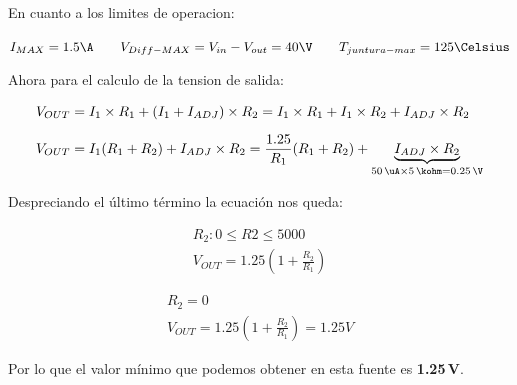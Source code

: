 \documentclass[chaptersright]{informeutn}
\begin{document}
        En cuanto a los limites de operacion:

        \begin{center}
          $I_{MAX}=1.5\A \qquad V_{Diff-MAX}=V_{in}-V_{out}=40\V \qquad T_{juntura-max}=125\Celsius$
        \end{center}

        Ahora para el calculo de la tension de salida:

        \begin{align*}
          V_{OUT} &= I_1 \times R_1 + \left(I_1 + I_{ADJ}\right) \times R_2
          = I_1 \times R_1 + I_1 \times R_2 + I_{ADJ} \times R_2 \\[6pt]
          V_{OUT} &= I_1 (R_1 + R_2) + I_{ADJ} \times R_2
          = \frac{1.25}{R_1} (R_1 + R_2) + \underbrace{I_{ADJ} \times R_2}_{50\,\uA \times 5\,\kohm = 0.25\,\V}
        \end{align*}

        Despreciando el último término la ecuación nos queda:

        \begin{figure}[H]
          \centering
          \begin{minipage}{0.4\textwidth}
            \begin{gather*}
              R_2: 0 \leq R2 \leq 5000\\
              V_{OUT} = 1.25 \left(1 + \frac{R_2}{R_1}\right)
            \end{gather*}
          \end{minipage}
          \hspace{1cm}
          \begin{minipage}{0.4\textwidth}
            \begin{gather*}
              R_2 = 0\\
              V_{OUT} = 1.25 \left(1 + \frac{R_2}{R_1}\right) = 1.25V
            \end{gather*}
          \end{minipage}
        \end{figure}

        Por lo que el valor mínimo que podemos obtener en esta fuente es \textbf{1.25\,V}.
    
\end{document}
